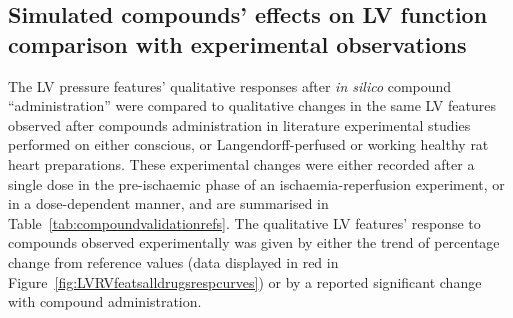 \subsection{Simulated compounds' effects on LV function comparison with experimental observations}\label{sec:ch6model_simulated_compounds'_effects_on_whole-organ_function_comparison_with_experimental_observations}
The LV pressure features' qualitative responses after \textit{in silico} compound ``administration'' were compared to qualitative changes in the same LV features observed after compounds administration in literature experimental studies performed on either conscious, or Langendorff-perfused or working healthy rat heart preparations. These experimental changes were either recorded after a single dose in the pre-ischaemic phase of an ischaemia-reperfusion experiment, or in a dose-dependent manner, and are summarised in Table~\ref{tab:compoundvalidationrefs}. The qualitative LV features' response to compounds observed experimentally was given by either the trend of percentage change from reference values (data displayed in red in Figure~\ref{fig:LVRVfeatsalldrugsrespcurves}) or by a reported significant change with compound administration. 


